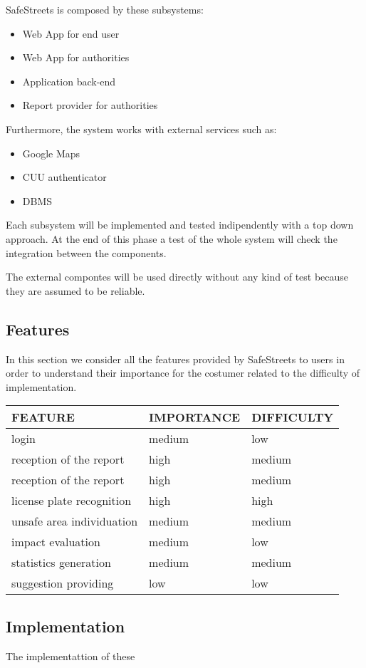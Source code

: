 SafeStreets is composed by these subsystems:
\begin{itemize}
	\item 
	Web App for end user
	\item 
	Web App for authorities
	\item 
	Application back-end
	\item 
	Report provider for authorities
\end{itemize}
Furthermore, the system works with external services such as:
\begin{itemize}
	\item 
	Google Maps 
	\item 
	CUU authenticator
	\item 
	DBMS
\end{itemize}

Each subsystem will be implemented and tested indipendently with a top down approach. At the end of this phase a test of the whole system will check the integration between the components. 

The external compontes will be used directly without any kind of test because they are assumed to be reliable.

\subsection{Features}

In this section we consider all the features provided by SafeStreets to users in order to understand their importance for the costumer related to the difficulty of implementation.

\begin{center}
	\begin{tabular}{ | p{6cm} | p{3.5cm} |p{3cm}|} 
		\hline
		FEATURE & IMPORTANCE & DIFFICULTY  \\ 
		\hline
		login & medium & low  \\ 
		\hline
		reception of the report  & high & medium  \\ 
		\hline
		reception of the report  & high & medium  \\ 
		\hline
		license plate recognition & high & high \\ 
		\hline
		unsafe area individuation & medium & medium \\ 
		\hline
		impact evaluation & medium & low \\ 
		\hline
		statistics generation & medium & medium \\ 
		\hline
		suggestion providing & low & low \\ 
		\hline
	\end{tabular}
\end{center}

\subsection{Implementation}
The implementattion of these 

